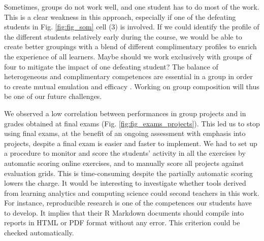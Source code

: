 \documentclass{aims}
\theoremstyle{definition}
\begin{document}
Sometimes, groups do not work well, and one student has to do most of
the work. This is a clear weakness in this approach, especially if one
of the defeating students in Fig. \ref {fig:fig_som} cell (3) is
involved. If we could identify the profile of the different students
relatively early during the course, we would be able to create better
groupings with a blend of different complimentary profiles to enrich the
experience of all learners. Maybe should we work exclusively with groups
of four to mitigate the impact of one defeating student? The balance of
heterogeneous and complimentary competences are essential in a group in
order to create mutual emulation and efficacy \cite{Mucchielli1996}.
Working on group composition will thus be one of our future challenges.

We observed a low correlation between performances in group projects and
in grades obtained at final exams (Fig. \ref {fig:fig_exams_projects}).
This led us to stop using final exams, at the benefit of an ongoing
assessment with emphasis into projects, despite a final exam is easier
and faster to implement. We had to set up a procedure to monitor and
score the students' activity in all the exercises by automatic scoring
online exercises, and to manually score all projects against evaluation
grids. This is time-consuming despite the partially automatic scoring
lowers the charge. It would be interesting to investigate whether tools
derived from learning analytics and computing science could second
teachers in this work. For instance, reproducible research is one of the
competences our students have to develop. It implies that their R
Markdown documents should compile into reports in HTML or PDF format
without any error. This criterion could be checked automatically.
\end{document}
